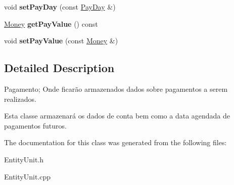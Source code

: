 \begin{DoxyCompactItemize}
\item 
\hypertarget{classPayment_aaadd94e11ab24629d536809da691efc5}{void {\bfseries set\-Pay\-Day} (const \hyperlink{classPayDay}{Pay\-Day} \&)}\label{classPayment_aaadd94e11ab24629d536809da691efc5}

\item 
\hypertarget{classPayment_a3a2d6a8dc3f6b63e924504e1994ae556}{\hyperlink{classMoney}{Money} {\bfseries get\-Pay\-Value} () const }\label{classPayment_a3a2d6a8dc3f6b63e924504e1994ae556}

\item 
\hypertarget{classPayment_ace63ad77804d5a19ace50aa1a7335050}{void {\bfseries set\-Pay\-Value} (const \hyperlink{classMoney}{Money} \&)}\label{classPayment_ace63ad77804d5a19ace50aa1a7335050}

\end{DoxyCompactItemize}


\subsection{Detailed Description}
Pagamento; Onde ficarão armazenados dados sobre pagamentos a serem realizados. 

Esta classe armazenará os dados de conta bem como a data agendada de pagamentos futuros. 

The documentation for this class was generated from the following files\-:\begin{DoxyCompactItemize}
\item 
Entity\-Unit.\-h\item 
Entity\-Unit.\-cpp\end{DoxyCompactItemize}
